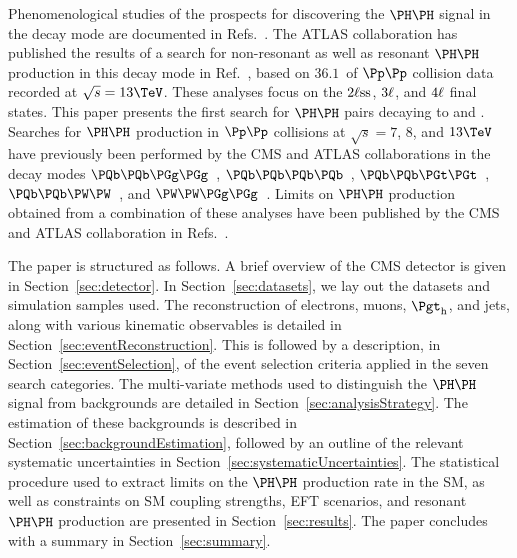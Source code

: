Phenomenological studies of the prospects for discovering the $\HH$ signal in the \WWWW decay mode
are documented in Refs.~\cite{Baur:2002rb,Baur:2002qd,Li:2015yia,Adhikary:2017jtu,Ren:2017jbg}.
The ATLAS collaboration has published the results of a search for non-resonant as well as resonant $\HH$ production in this decay mode in Ref.~\cite{Aaboud:2018ksn},
based on $36.1$~\fbinv of $\Pp\Pp$ collision data recorded at $\sqrt{s} = 13\TeV$.
These analyses focus on the $2\ell\text{ss}$, $3\ell$, and $4\ell$ final states.
This paper presents the first search for $\HH$ pairs decaying to \WWtt and \tttt.
Searches for $\HH$ production in $\Pp\Pp$ collisions at $\sqrt{s} = 7$, $8$, and $13\TeV$
have previously been performed by the CMS and ATLAS collaborations in the decay modes 
$\Pbottom\Pbottom\PGg\PGg$~\cite{Aad:2014yja,Khachatryan:2016sey,Sirunyan:2018iwt,Aaboud:2018ftw}, 
$\Pbottom\Pbottom\Pbottom\Pbottom$~\cite{Khachatryan:2015yea,Aad:2015uka,Aaboud:2018knk,Sirunyan:2018zkk,Sirunyan:2018tki}, 
$\Pbottom\Pbottom\PGt\PGt$~\cite{Aad:2015xja,Sirunyan:2017tqo,Sirunyan:2017djm,Aaboud:2018sfw}, 
$\Pbottom\Pbottom\PW\PW$~\cite{Sirunyan:2017guj}, 
and $\PW\PW\PGg\PGg$~\cite{Aaboud:2018ewm}.
Limits on $\HH$ production obtained from a combination of these analyses have been published by the CMS and ATLAS collaboration 
in Refs.~\cite{Aad:2015xja,Sirunyan:2017tqo,Sirunyan:2018ayu}.

The paper is structured as follows.
A brief overview of the CMS detector is given in Section~\ref{sec:detector}.
In Section~\ref{sec:datasets}, we lay out the datasets and simulation samples used.
The reconstruction of electrons, muons, $\tauh$, and jets,
along with various kinematic observables is detailed in Section~\ref{sec:eventReconstruction}.
This is followed by a description, in Section~\ref{sec:eventSelection}, of the event selection criteria applied in the seven search categories.
The multi-variate methods used to distinguish the $\HH$ signal from backgrounds are detailed in Section~\ref{sec:analysisStrategy}.
The estimation of these backgrounds is described in Section~\ref{sec:backgroundEstimation},
followed by an outline of the relevant systematic uncertainties in Section~\ref{sec:systematicUncertainties}.
The statistical procedure used to extract limits on the $\HH$ production rate in the SM, as well as constraints on SM coupling strengths, EFT scenarios, and resonant $\HH$ production are presented in Section~\ref{sec:results}.
The paper concludes with a summary in Section~\ref{sec:summary}.
